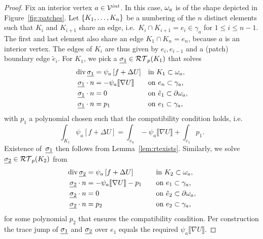 \documentclass[thesis.tex]{subfiles}
\begin{document}
\begin{proof}
  Fix an interior vertex $a \in \mathcal{V}^{int}$. In this case, $\omega_a$ is of the shape depicted in Figure~\ref{fig:patches}. Let $\set{K_1,\dots,K_n}$ be a numbering
  of the $n$ distinct elements such that $K_i$ and $K_{i+1}$ share an edge, 
  i.e.~$K_i \cap K_{i+1} =e_i \in \gamma_a$ for $1 \leq i \leq n-1$. The first and last element also share an edge $K_1 \cap K_n = e_n$,
  because $a$ is an interior vertex. The edges of $K_i$ are thus given by $e_i, e_{i-1}$ and a (patch) boundary edge $\tilde e_i$. 
  For $K_1$, we pick a $\underline{\sigma_1}\in \mathcal{RT}_p(K_1)$ that solves 
  \begin{equation}
    \label{eq:first}
  \begin{alignedat}{3}
    \operatorname{div} \underline{\sigma_1} &= \psi_a \left [f + \Delta U\right] && \quad\text{in }  K_1\subset \omega_a ,\\
    \underline{\sigma_1} \cdot n  &=-\psi_a \llbracket \nabla U \rrbracket && \quad \text{on } e_n \subset \gamma_a,\\
    \underline{\sigma_1} \cdot n  &= 0 && \quad \text{on } \tilde e_1 \subset \partial \omega_a,\\
    \underline{\sigma_1} \cdot n  &= p_1 && \quad \text{on } e_{1} \subset \gamma_a,
  \end{alignedat}
\end{equation}
  with $p_1$ a polynomial chosen such that the compatibility condition holds, i.e.
  \[
    \int_{K_1} \psi_a \left[ f + \Delta U\right] = \int_{e_n} - \psi_a \llbracket \nabla U \rrbracket + \int_{e_1} p_1.
  \]  
  Existence of~$\underline{\sigma_1}$
  then follows from Lemma~\ref{lem:rtexists}. Similarly, we solve $\underline{\sigma_2} \in \mathcal{RT}_p(K_2)$ from
  \begin{alignat*}{3}
    \operatorname{div} \underline{\sigma_2} &= \psi_a \left [f + \Delta U\right] && \quad\text{in }  K_2\subset \omega_a ,\\
     \underline{\sigma_2} \cdot n  &= -\psi_a \llbracket \nabla U \rrbracket - p_1 && \quad \text{on } e_1 \subset \gamma_a,\\
    \underline{\sigma_2} \cdot n  &= 0 && \quad \text{on } \tilde e_2 \subset \partial \omega_a,\\
    \underline{\sigma_2} \cdot n  &= p_2 && \quad \text{on } e_{2} \subset \gamma_a,
  \end{alignat*}
  for some polynomial $p_2$ that ensures the compatibility condition. Per construction the trace jump of $\underline{\sigma_1}$ and $\underline{\sigma_2}$ over
  $e_1$ equals the required $\psi_a \llbracket \nabla U \rrbracket$.
  

\end{proof}
\end{document}
